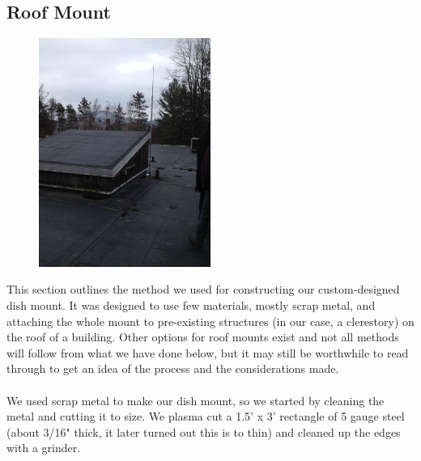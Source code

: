 \documentclass[11pt]{article} %
\begin{document}

\subsection{Roof Mount}


\begin{figure}
  \centering
  \caption{   }
  \includegraphics[width=0.50\textwidth]{roofmount/00.jpeg}
\end{figure}



This section outlines the method we used for constructing our custom-designed dish mount. It was designed to use few materials, mostly scrap metal, and attaching the whole mount to pre-existing structures (in our case, a clerestory) on the roof of a building. Other options for roof mounts exist and not all methods will follow from what we have done below, but it may still be worthwhile to read through to get an idea of the process and the considerations made.
\\ \\
We used scrap metal to make our dish mount, so we started by cleaning the metal and cutting it to size. We plasma cut a 1.5' x 3' rectangle of 5 gauge steel (about 3/16" thick, it later turned out this is to thin) and cleaned up the edges with a grinder.
\end{document}
